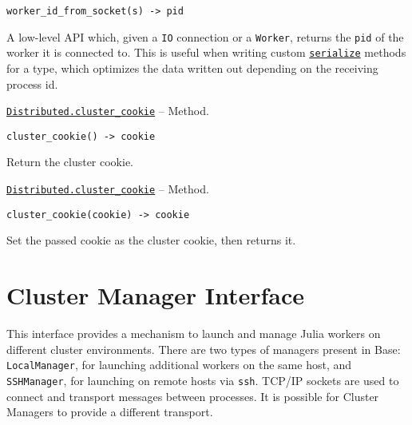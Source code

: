\begin{adjustwidth}{2em}{0pt}


\begin{verbatim}
worker_id_from_socket(s) -> pid
\end{verbatim}

A low-level API which, given a \texttt{IO} connection or a \texttt{Worker}, returns the \texttt{pid} of the worker it is connected to. This is useful when writing custom \hyperlink{17931089632175850899}{\texttt{serialize}} methods for a type, which optimizes the data written out depending on the receiving process id.



\end{adjustwidth}
\hypertarget{914110747490695974}{}
\hyperlink{914110747490695974}{\texttt{Distributed.cluster\_cookie}}  -- {Method.}

\begin{adjustwidth}{2em}{0pt}


\begin{verbatim}
cluster_cookie() -> cookie
\end{verbatim}

Return the cluster cookie.



\end{adjustwidth}
\hypertarget{7078615008605512632}{}
\hyperlink{7078615008605512632}{\texttt{Distributed.cluster\_cookie}}  -- {Method.}

\begin{adjustwidth}{2em}{0pt}


\begin{verbatim}
cluster_cookie(cookie) -> cookie
\end{verbatim}

Set the passed cookie as the cluster cookie, then returns it.



\end{adjustwidth}

\hypertarget{6819108494041220011}{}


\section{Cluster Manager Interface}



This interface provides a mechanism to launch and manage Julia workers on different cluster environments. There are two types of managers present in Base: \texttt{LocalManager}, for launching additional workers on the same host, and \texttt{SSHManager}, for launching on remote hosts via \texttt{ssh}. TCP/IP sockets are used to connect and transport messages between processes. It is possible for Cluster Managers to provide a different transport.



